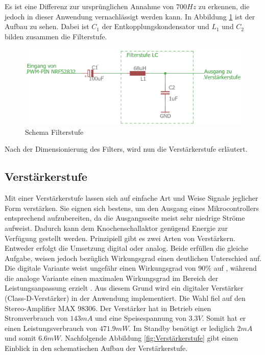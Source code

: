 Es ist eine Differenz zur ursprünglichen Annahme von $700 Hz$ zu erkennen, die jedoch in dieser Anwendung vernachlässigt werden kann. In Abbildung \ref{fig:Filterstufe} ist der Aufbau zu sehen. Dabei ist $C_{1}$ der Entkopplungskondensator und $L_{1}$ und $C_{2}$ bilden zusammen die Filterstufe.

\begin{figure}[H]
	\begin{center}
		\includegraphics[width=120mm]{data/Schema_Filterstufe.png}
		\caption{Schema Filterstufe}
		\label{fig:Filterstufe}
	\end{center}
\end{figure}


Nach der Dimensionierung des Filters, wird nun die Verstärkerstufe erläutert.

\subsection{Verstärkerstufe} \label{sec:verstaerkerstufe}
Mit einer Verstärkerstufe lassen sich auf einfache Art und Weise Signale jeglicher Form verstärken. Sie eignen sich bestens, um den Ausgang eines Mikrocontrollers entsprechend aufzubereiten, da die Ausgangsseite meist sehr niedrige Ströme aufweist. Dadurch kann dem Knochenschallaktor genügend Energie zur Verfügung gestellt werden. Prinzipiell gibt es zwei Arten von Verstärkern. Entweder erfolgt die Umsetzung digital oder analog. Beide erfüllen die gleiche Aufgabe, weisen jedoch bezüglich Wirkungsgrad einen deutlichen Unterschied auf. Die digitale Variante weist ungefähr einen Wirkungsgrad von 90$\%$ auf \cite{BoneConductorAdafruit}, während die analoge Variante einen maximalen Wirkungsgrad im Bereich der Leistungsanpassung erzielt \cite{Niklaus_Skript}. Aus diesem Grund wird ein digitaler Verstärker (Class-D-Verstärker) in der Anwendung implementiert. Die Wahl fiel auf den Stereo-Amplifier MAX 98306. Der Verstärker hat in Betrieb einen Stromverbrauch von $143mA$ und eine Speisespannung von $3.3V$. Somit hat er einen Leistungsverbrauch von $471.9 mW$. Im Standby benötigt er lediglich $2 mA$ und somit $6.6 mW$\cite{Verstaerker}. Nachfolgende Abbildung \ref{fig:Verstärkerstufe} gibt einen Einblick in den schematischen Aufbau der Verstärkerstufe.


